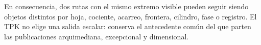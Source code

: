 En consecuencia, dos rutas con el mismo extremo visible pueden seguir siendo
objetos distintos por hoja, cociente, acarreo, frontera, cilindro, fase o
registro. El TPK no elige una salida escalar: conserva el antecedente común
del que parten las publicaciones arquimediana, excepcional y dimensional.

\long{}
